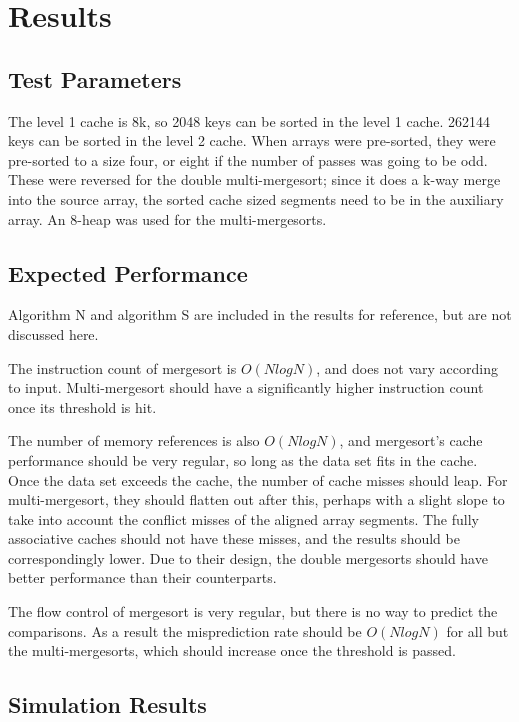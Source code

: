 \section{Results}
\subsection{Test Parameters}
The level 1 cache is 8k, so 2048 keys can be sorted in the level 1 cache.
262144 keys can be sorted in the level 2 cache. When arrays were pre-sorted,
they were pre-sorted to a size four, or eight if the number of passes was going
to be odd. These were reversed for the double multi-mergesort; since it does a
k-way merge into the source array, the sorted cache sized segments need to be in
the auxiliary array. An 8-heap was used for the multi-mergesorts.

\subsection{Expected Performance}

Algorithm N and algorithm S are included in the results for reference, but are
not discussed here.

The instruction count of mergesort is $O(NlogN)$, and does not vary
according to input. Multi-mergesort should have a significantly higher
instruction count once its threshold is hit.

The number of memory references is also $O(NlogN)$, and mergesort's cache
performance should be very regular, so long as the data set fits in the cache. Once
the data set exceeds the cache, the number of cache misses should leap. For
multi-mergesort, they should flatten out after this, perhaps with a slight
slope to take into account the conflict misses of the aligned array segments. The
fully associative caches should not have these misses, and the results should be
correspondingly lower. Due to their design, the double mergesorts should have
better performance than their counterparts.

The flow control of mergesort is very regular, but there is no way to predict
the comparisons. As a result the misprediction rate should be $O(NlogN)$ for
all but the multi-mergesorts, which should increase once the threshold is
passed.

\subsection{Simulation Results}
\label{Mergesort results}


